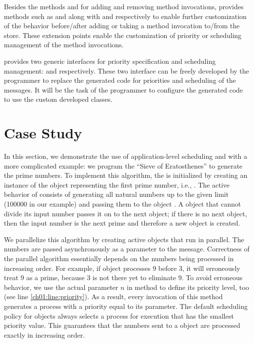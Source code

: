 Besides the methods  and  for adding and removing method invocations,  provides methods such as  and  along with  and  respectively to enable  further customization of the behavior before/after adding or taking a method invocation to/from the store. These extension points enable the customization of priority or scheduling management of the method invocations.

\Crisp provides two generic interfaces for priority specification and scheduling management:  and  respectively. These two interface can be freely developed by the programmer to replace the generated code for priorities and scheduling of the messages. It will be the task of the programmer to configure the generated code to use the custom developed classes.

\section{Case Study} \label{ch01:sec:caseStudy}

In this section, we demonstrate the use of application-level scheduling and \Crisp with a more complicated example: we program the ``Sieve of Eratosthenes'' %
to generate the prime numbers. 
To implement this algorithm, the 
 is initialized by creating an instance of the  object representing the first prime number, i.e., . The active behavior of  consists of generating all natural numbers up to the given limit (100000 in our example) and passing them to the object . 
A  object that cannot divide its input number passes it on to the next  object; if there is no next object, then the input number is the next prime and therefore a new object is created.

We parallelize this algorithm by creating active objects that run in parallel.
The numbers are passed asynchronously as a parameter to the  message. 
Correctness of the parallel algorithm essentially depends on the numbers being processed in increasing order.
For example, if object  processes 9 before 3, it will erroneously treat 9 as a prime, because 3 is not there yet to eliminate 9. 
%
To avoid erroneous behavior, we use the actual parameter $n$ in  method to define its priority level, too (see line \ref{ch01:line:priority}). 
As a result, every invocation of this method generates a process with a priority equal to its parameter.
The default scheduling policy for objects always selects a process for execution that has the smallest priority value. 
This guarantees that the numbers sent to a  object are processed exactly in increasing order. 

